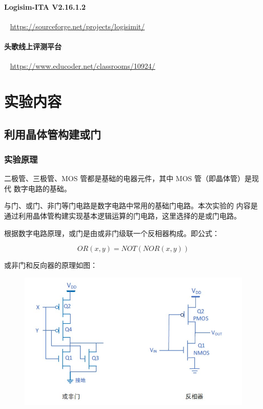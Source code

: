 \documentclass[UTF8]{ctexart}
\begin{document}
\paragraph{Logisim-ITA V2.16.1.2}~{}
\newline
\href{https://sourceforge.net/projects/logisimit/}{https://sourceforge.net/projects/logisimit/}

\paragraph{头歌线上评测平台}~{}
\newline
\href{https://www.educoder.net/classrooms/10924/}{https://www.educoder.net/classrooms/10924/}


\section{实验内容}

\subsection{利用晶体管构建或门}

\subsubsection{实验原理}

二极管、三极管、MOS 管都是基础的电器元件，其中 MOS 管（即晶体管）是现代
数字电路的基础。

与门、或门、非门等门电路是数字电路中常用的基础门电路。本次实验的
内容是通过利用晶体管构建实现基本逻辑运算的门电路，这里选择的是或门电路。

根据数字电路原理，或门是由或非门级联一个反相器构成。即公式：

\[
    OR(x, y) = NOT(NOR(x, y))
\]

或非门和反向器的原理如图：

\begin{figure}[H]
    \centering
    \includegraphics[width = .8\textwidth]{images/gates.jpg}
\end{figure}
\end{document}
